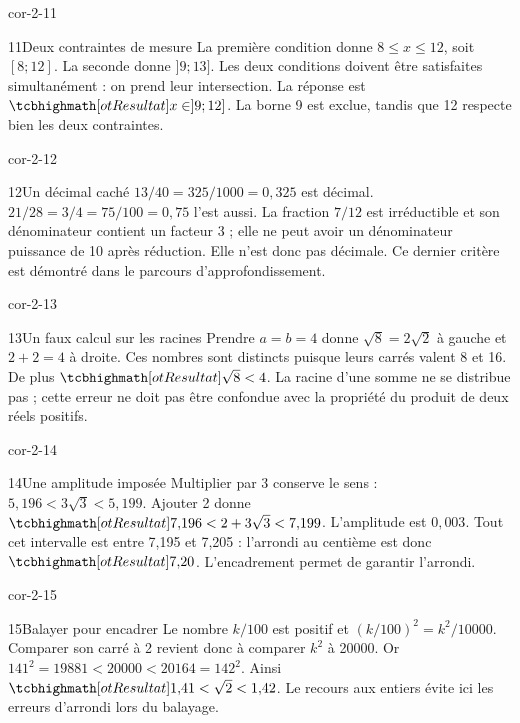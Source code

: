 \begin{blocLivre}{cor-2-11}
\begin{corrige}{11}{Deux contraintes de mesure}
La première condition donne $8\le x\le12$, soit $[8;12]$. La seconde donne $]9;13]$. Les deux conditions doivent être satisfaites simultanément : on prend leur intersection. La réponse est $\res{x\in]9;12]}$. La borne 9 est exclue, tandis que 12 respecte bien les deux contraintes.
\end{corrige}
\end{blocLivre}
\begin{blocLivre}{cor-2-12}
\begin{corrige}{12}{Un décimal caché}
$13/40=325/1000=0{,}325$ est décimal. $21/28=3/4=75/100=0{,}75$ l’est aussi. La fraction $7/12$ est irréductible et son dénominateur contient un facteur 3 ; elle ne peut avoir un dénominateur puissance de 10 après réduction. Elle n’est donc pas décimale. Ce dernier critère est démontré dans le parcours d’approfondissement.
\end{corrige}
\end{blocLivre}
\begin{blocLivre}{cor-2-13}
\begin{corrige}{13}{Un faux calcul sur les racines}
Prendre $a=b=4$ donne $\sqrt8=2\sqrt2$ à gauche et $2+2=4$ à droite. Ces nombres sont distincts puisque leurs carrés valent 8 et 16. De plus $\res{\sqrt8<4}$. La racine d’une somme ne se distribue pas ; cette erreur ne doit pas être confondue avec la propriété du produit de deux réels positifs.
\end{corrige}
\end{blocLivre}
\begin{blocLivre}{cor-2-14}
\begin{corrige}{14}{Une amplitude imposée}
Multiplier par 3 conserve le sens : $5{,}196<3\sqrt3<5{,}199$. Ajouter 2 donne $\res{7{,}196<2+3\sqrt3<7{,}199}$. L’amplitude est $0{,}003$. Tout cet intervalle est entre 7,195 et 7,205 : l’arrondi au centième est donc $\res{7{,}20}$. L’encadrement permet de garantir l’arrondi.
\end{corrige}
\end{blocLivre}
\begin{blocLivre}{cor-2-15}
\begin{corrige}{15}{Balayer pour encadrer}
Le nombre $k/100$ est positif et $(k/100)^2=k^2/10000$. Comparer son carré à 2 revient donc à comparer $k^2$ à 20000. Or $141^2=19881<20000<20164=142^2$. Ainsi $\res{1{,}41<\sqrt2<1{,}42}$. Le recours aux entiers évite ici les erreurs d’arrondi lors du balayage.
\end{corrige}
\end{blocLivre}

